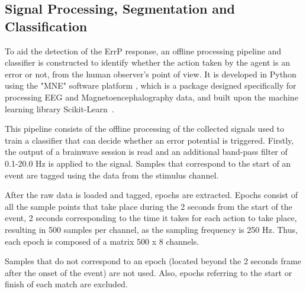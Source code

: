 \documentclass[journal]{IEEEtran}
\begin{document}
{%


\subsection{Signal Processing, Segmentation and Classification}
\label{section:calibration}

To aid the detection of the ErrP response, an offline processing pipeline and classifier is constructed to identify whether the action taken by the agent is an error or not, from the human observer's point of view. It is developed in Python using the "MNE" software platform \cite{MNE-PYTHON}, which is a package designed specifically for processing EEG and Magnetoencephalography data, and built upon the machine learning library Scikit-Learn~\cite{scikit-learn}.

This pipeline consists of the offline processing of the collected signals used to train a classifier that can decide whether an error potential is triggered. Firstly, the output of a brainwave session is read and an additional band-pass filter of 0.1-20.0 Hz is applied to the signal. Samples that correspond to the start of an event are tagged using the data from the stimulus channel.

After the raw data is loaded and tagged, epochs are extracted. Epochs consist of all the sample points that take place during the 2 seconds from the start of the event, 2 seconds corresponding to the time it takes for each action to take place, resulting in 500 samples per channel, as the sampling frequency is 250 Hz. Thus, each epoch is composed of a matrix $500$ x $8$ channels.

Samples that do not correspond to an epoch (located beyond the 2 seconds frame after the onset of the event) are not used. Also, epochs referring to the start or finish of each match are excluded.

}
\end{document}
